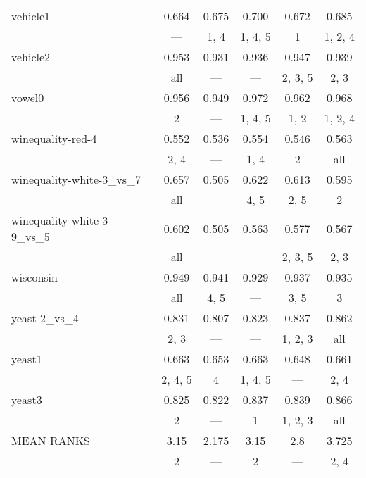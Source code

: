 \begin{tabular}{lccccc}
 vehicle1                   & 0.664   & 0.675   & 0.700   & 0.672    & 0.685    \\
                            & ---     & 1, 4    & 1, 4, 5 & 1        & 1, 2, 4  \\
 vehicle2                   & 0.953   & 0.931   & 0.936   & 0.947    & 0.939    \\
                            & all     & ---     & ---     & 2, 3, 5  & 2, 3     \\
 vowel0                     & 0.956   & 0.949   & 0.972   & 0.962    & 0.968    \\
                            & 2       & ---     & 1, 4, 5 & 1, 2     & 1, 2, 4  \\
 winequality-red-4          & 0.552   & 0.536   & 0.554   & 0.546    & 0.563    \\
                            & 2, 4    & ---     & 1, 4    & 2        & all      \\
 winequality-white-3\_vs\_7   & 0.657   & 0.505   & 0.622   & 0.613    & 0.595    \\
                            & all     & ---     & 4, 5    & 2, 5     & 2        \\
 winequality-white-3-9\_vs\_5 & 0.602   & 0.505   & 0.563   & 0.577    & 0.567    \\
                            & all     & ---     & ---     & 2, 3, 5  & 2, 3     \\
 wisconsin                  & 0.949   & 0.941   & 0.929   & 0.937    & 0.935    \\
                            & all     & 4, 5    & ---     & 3, 5     & 3        \\
 yeast-2\_vs\_4               & 0.831   & 0.807   & 0.823   & 0.837    & 0.862    \\
                            & 2, 3    & ---     & ---     & 1, 2, 3  & all      \\
 yeast1                     & 0.663   & 0.653   & 0.663   & 0.648    & 0.661    \\
                            & 2, 4, 5 & 4       & 1, 4, 5 & ---      & 2, 4     \\
 yeast3                     & 0.825   & 0.822   & 0.837   & 0.839    & 0.866    \\
                            & 2       & ---     & 1       & 1, 2, 3  & all      \\
 \hline
MEAN RANKS                 & 3.15    & 2.175   & 3.15    & 2.8      & 3.725    \\
                            & 2       & ---     & 2       & ---      & 2, 4     \\
\hline
\end{tabular}